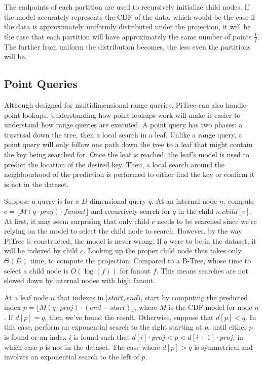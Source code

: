\documentclass[sigconf,10pt]{acmart}
\begin{document}
The endpoints of each partition are used to recursively initialize child nodes.
If the model accurately represents the CDF of the data, which would be the case
if the data is approximately uniformly distributed under the projection,
it will be the case that each partition will have approximately the same number of
points $\frac{1}{f}$. The further from uniform the distribution becomes,
the less even the partitions will be.


\subsection{Point Queries}

Although designed for multidimensional range queries,
PiTree can also handle point lookups. Understanding how point lookups
work will make it easier to understand how range queries are executed.
A point query has two phases: a traversal down the tree, then a local search
in a leaf.
Unlike a range query, a point query will only follow one path down the tree to
a leaf that might contain the key being searched for. Once the leaf is reached,
the leaf's model is used to predict the location of the desired key. 
Then, a local search around the neighbourhood of the prediction is performed
to either find the key or confirm it is not in the dataset.

Suppose a query is for a $D$ dimensional query $q$.
At an internal node $n$, compute $c = \lfloor M(q \cdot proj) \cdot fanout \rfloor$
and recursively search for $q$ in the child $n.child[c]$.
At first, it may seem surprising that only child $c$ needs to be searched
since we're relying on the model to select the child node to search.
However, by the way PiTree is constructed, the model is never wrong.
If $q$ were to be in the dataset,
it will be indexed by child $c$. Looking up the proper child node thus takes only
$\Theta(D)$ time, to compute the projection. Compared to a B-Tree, whose
time to select a child node is $O(\log(f))$ for fanout $f$. This means
searches are not slowed down by internal nodes with high fanout.

At a leaf node $n$ that indexes in $[start, end)$, start by computing the predicted
index
$p = \lfloor M(q \cdot proj) \cdot (end - start) \rfloor$, where $M$ is the CDF model for node $n$.
If $d[p] = q$, then we've found the result.
Otherwise, suppose that $d[p] < q$.
In this case, perform an exponential search to the right starting at $p$,
until either $p$ is found or an index $i$ is found such that 
$d[i] \cdot proj < p < d[i+1] \cdot proj$, in which case $p$ is not in the dataset.
The case where $d[p] > q$ is symmetrical and involves an exponential search
to the left of $p$.
\end{document}
